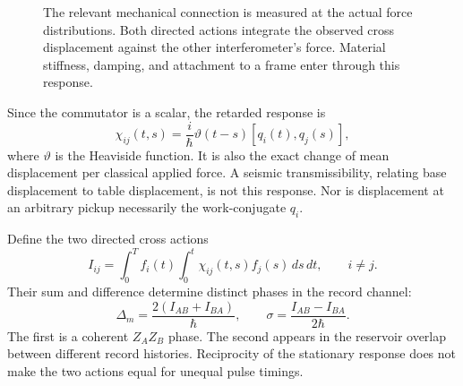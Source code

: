 \documentclass[aps,pra,reprint,amsmath,amssymb,longbibliography,floatfix]{revtex4-2}
\begin{document}
\begin{figure}[t]
\centering
{}
\caption{The relevant mechanical connection is measured at the actual force distributions. Both directed actions integrate the observed cross displacement against the other interferometer's force. Material stiffness, damping, and attachment to a frame enter through this response.}
\label{fig:ports}
\end{figure}

Since the commutator is a scalar, the retarded response is
\begin{equation}
\chi_{ij}(t,s)=\frac{i}{\hbar}\vartheta(t-s)[q_i(t),q_j(s)],
\label{eq:chi}
\end{equation}
where $\vartheta$ is the Heaviside function. It is also the exact change of mean displacement per classical applied force. A seismic transmissibility, relating base displacement to table displacement, is not this response. Nor is displacement at an arbitrary pickup necessarily the work-conjugate $q_i$.

Define the two directed cross actions
\begin{equation}
I_{ij}=\int_0^T f_i(t)\int_0^t\chi_{ij}(t,s)f_j(s)\,ds\,dt,\qquad i\ne j.
\label{eq:actions}
\end{equation}
Their sum and difference determine distinct phases in the record channel:
\begin{equation}
\Delta_m=\frac{2(I_{AB}+I_{BA})}{\hbar},\qquad
\sigma=\frac{I_{AB}-I_{BA}}{2\hbar}.
\label{eq:phases}
\end{equation}
The first is a coherent $Z_AZ_B$ phase. The second appears in the reservoir overlap between different record histories. Reciprocity of the stationary response does not make the two actions equal for unequal pulse timings.
\end{document}
